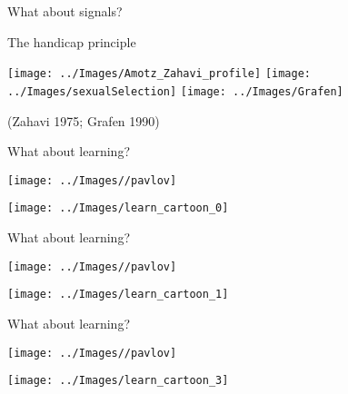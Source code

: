 \documentclass[
  ignorenonframetext,
  aspectratio=169]{beamer}
\begin{document}
\begin{frame}{What about signals?}
\protect\hypertarget{what-about-signals}{}
\begin{block}{The handicap principle}
\protect\hypertarget{the-handicap-principle}{}
\begin{center}\texttt{[image: ../Images/Amotz\_Zahavi\_profile]} \texttt{[image: ../Images/sexualSelection]} \texttt{[image: ../Images/Grafen]} \end{center}

\vspace{0.6cm}

(Zahavi 1975; Grafen 1990)
\end{block}
\end{frame}

\begin{frame}{What about learning?}
\protect\hypertarget{what-about-learning}{}
\begin{center}\texttt{[image: ../Images//pavlov]} \end{center}

\begin{center}\texttt{[image: ../Images/learn\_cartoon\_0]} \end{center}
\end{frame}

\begin{frame}{What about learning?}
\protect\hypertarget{what-about-learning-1}{}
\begin{center}\texttt{[image: ../Images//pavlov]} \end{center}

\begin{center}\texttt{[image: ../Images/learn\_cartoon\_1]} \end{center}
\end{frame}

\begin{frame}{What about learning?}
\protect\hypertarget{what-about-learning-2}{}
\begin{center}\texttt{[image: ../Images//pavlov]} \end{center}

\begin{center}\texttt{[image: ../Images/learn\_cartoon\_3]} \end{center}
\end{frame}
\end{document}
